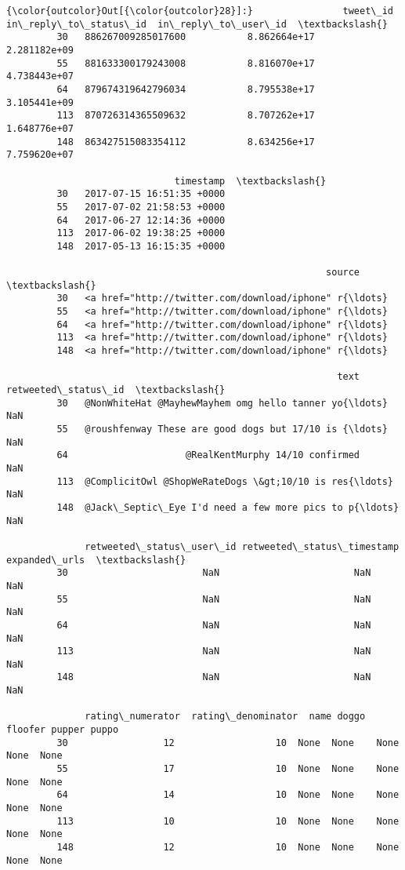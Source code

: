 \documentclass[11pt]{article}
\begin{document}
\begin{Verbatim}[commandchars=\\\{\}]
{\color{outcolor}Out[{\color{outcolor}28}]:}                tweet\_id  in\_reply\_to\_status\_id  in\_reply\_to\_user\_id  \textbackslash{}
         30   886267009285017600           8.862664e+17         2.281182e+09   
         55   881633300179243008           8.816070e+17         4.738443e+07   
         64   879674319642796034           8.795538e+17         3.105441e+09   
         113  870726314365509632           8.707262e+17         1.648776e+07   
         148  863427515083354112           8.634256e+17         7.759620e+07   
         
                              timestamp  \textbackslash{}
         30   2017-07-15 16:51:35 +0000   
         55   2017-07-02 21:58:53 +0000   
         64   2017-06-27 12:14:36 +0000   
         113  2017-06-02 19:38:25 +0000   
         148  2017-05-13 16:15:35 +0000   
         
                                                         source  \textbackslash{}
         30   <a href="http://twitter.com/download/iphone" r{\ldots}   
         55   <a href="http://twitter.com/download/iphone" r{\ldots}   
         64   <a href="http://twitter.com/download/iphone" r{\ldots}   
         113  <a href="http://twitter.com/download/iphone" r{\ldots}   
         148  <a href="http://twitter.com/download/iphone" r{\ldots}   
         
                                                           text  retweeted\_status\_id  \textbackslash{}
         30   @NonWhiteHat @MayhewMayhem omg hello tanner yo{\ldots}                  NaN   
         55   @roushfenway These are good dogs but 17/10 is {\ldots}                  NaN   
         64                     @RealKentMurphy 14/10 confirmed                  NaN   
         113  @ComplicitOwl @ShopWeRateDogs \&gt;10/10 is res{\ldots}                  NaN   
         148  @Jack\_Septic\_Eye I'd need a few more pics to p{\ldots}                  NaN   
         
              retweeted\_status\_user\_id retweeted\_status\_timestamp expanded\_urls  \textbackslash{}
         30                        NaN                        NaN           NaN   
         55                        NaN                        NaN           NaN   
         64                        NaN                        NaN           NaN   
         113                       NaN                        NaN           NaN   
         148                       NaN                        NaN           NaN   
         
              rating\_numerator  rating\_denominator  name doggo floofer pupper puppo  
         30                 12                  10  None  None    None   None  None  
         55                 17                  10  None  None    None   None  None  
         64                 14                  10  None  None    None   None  None  
         113                10                  10  None  None    None   None  None  
         148                12                  10  None  None    None   None  None  
\end{Verbatim}
            
\end{document}
